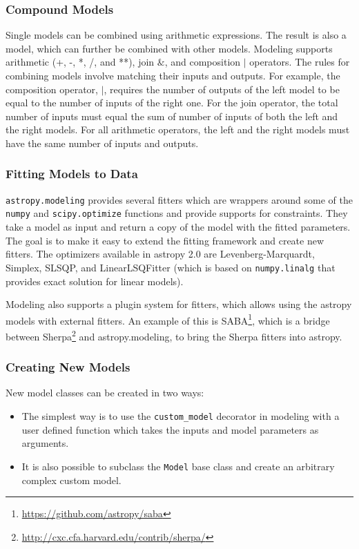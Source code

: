 \documentclass[modern]{aastex61}
\newcommand{\package}[1]{\texttt{#1}\xspace}
\begin{document}
\subsubsection{Compound Models}
Single models can be combined using arithmetic expressions. The result is also a model, which can further be combined with other models. Modeling supports arithmetic (+, -, *, /, and **), join $\&$, and composition $|$ operators. The rules for combining models involve matching their inputs and outputs. For example, the composition operator, $|$, requires the number of outputs of the left model to be equal to the number of inputs of the right one. For the join operator, the total number of inputs must equal the sum of number of inputs of both the left and the right models. For all arithmetic operators, the left and the right models must have the same number of inputs and outputs. 

\subsubsection{Fitting Models to Data}

\package{astropy.modeling} provides several fitters which are wrappers around some of the \texttt{numpy} and \texttt{scipy.optimize} functions and provide supports for constraints. They take a model as input and return a copy of the model with the fitted parameters. The goal is to make it easy to extend the fitting framework and create new fitters. The optimizers available in astropy 2.0 are Levenberg-Marquardt, Simplex, SLSQP, and LinearLSQFitter (which is based on \texttt{numpy.linalg} that provides exact solution for linear models).

Modeling also supports a plugin system for fitters, which allows using the
astropy models with external fitters. An example of this is
SABA\footnote{\url{https://github.com/astropy/saba}}, which is a bridge between
Sherpa\footnote{\url{http://cxc.cfa.harvard.edu/contrib/sherpa/}}
and astropy.modeling, to bring the Sherpa fitters into astropy.

\subsubsection{Creating New Models}

New model classes can be created in two ways:
\begin{itemize}
   \item The simplest way is to use the \texttt{custom\_model} decorator in modeling with a user defined function which takes the inputs and model parameters as arguments.
   \item It is also possible to subclass the \texttt{Model} base class and create an arbitrary complex custom model.
\end{itemize}
\end{document}
